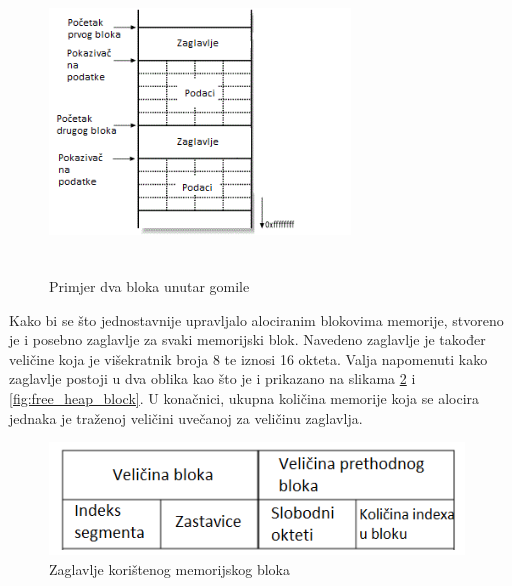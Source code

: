 \documentclass[times, utf8, diplomski, numeric]{fer}
\begin{document}
\begin{figure}[!ht]
\centering
\setlength\fboxsep{0pt}
\setlength\fboxrule{0.5pt}
\includegraphics[width=8cm, height=8cm]{slike/heap_2_allocated_blocks}
\caption{Primjer dva bloka unutar gomile}
\label{fig:heap_2_allocated_blocks} 
\end{figure}

Kako bi se što jednostavnije upravljalo alociranim blokovima
memorije, stvoreno je i posebno zaglavlje za svaki memorijski
blok. Navedeno zaglavlje je također veličine koja je višekratnik
broja 8 te iznosi 16 okteta. Valja napomenuti kako zaglavlje
postoji u dva oblika kao što je i prikazano na slikama 
\ref{fig:used_heap_block} i \ref{fig:free_heap_block}. U
konačnici, ukupna količina memorije koja se alocira jednaka je
traženoj veličini uvečanoj za veličinu zaglavlja.				%


\begin{figure}[!ht]
\centering
\setlength\fboxsep{0pt}
\setlength\fboxrule{0.5pt}
\includegraphics[width=11cm, height=3cm]{slike/used_heap_block}
\caption{Zaglavlje korištenog memorijskog bloka}
\label{fig:used_heap_block} 
\end{figure}
\end{document}
